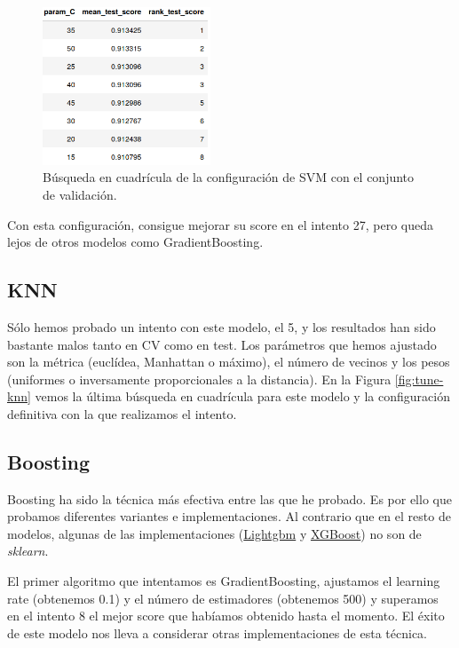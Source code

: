 \documentclass{article}
\begin{document}
\begin{figure}[H]
  \centering
  \includegraphics[width=50mm]{imgs/val-svm}
  \caption{Búsqueda en cuadrícula de la configuración de SVM con el conjunto de validación.}
  \label{fig:val-svm}
\end{figure}

Con esta configuración, consigue mejorar su score en el intento 27,
pero queda lejos de otros modelos como GradientBoosting.

\subsection{KNN}

Sólo hemos probado un intento con este modelo, el 5, y los resultados
han sido bastante malos tanto en CV como en test. Los parámetros que
hemos ajustado son la métrica (euclídea, Manhattan o máximo), el
número de vecinos y los pesos (uniformes o inversamente proporcionales
a la distancia). En la Figura \ref{fig:tune-knn} vemos la última
búsqueda en cuadrícula para este modelo y la configuración definitiva
con la que realizamos el intento.

\subsection{Boosting}

Boosting ha sido la técnica más efectiva entre las que he probado. Es
por ello que probamos diferentes variantes e implementaciones. Al
contrario que en el resto de modelos, algunas de las implementaciones
(\href{https://lightgbm.readthedocs.io/en/latest/pythonapi/lightgbm.LGBMClassifier.html}{Lightgbm}
y
\href{https://xgboost.readthedocs.io/en/latest/python/python_api.html#xgboost.XGBClassifier}{XGBoost})
no son de \textit{sklearn}.

El primer algoritmo que intentamos es GradientBoosting, ajustamos el
learning rate (obtenemos 0.1) y el número de estimadores (obtenemos
500) y superamos en el intento 8 el mejor score que habíamos obtenido
hasta el momento. El éxito de este modelo nos lleva a considerar otras
implementaciones de esta técnica.
\end{document}
